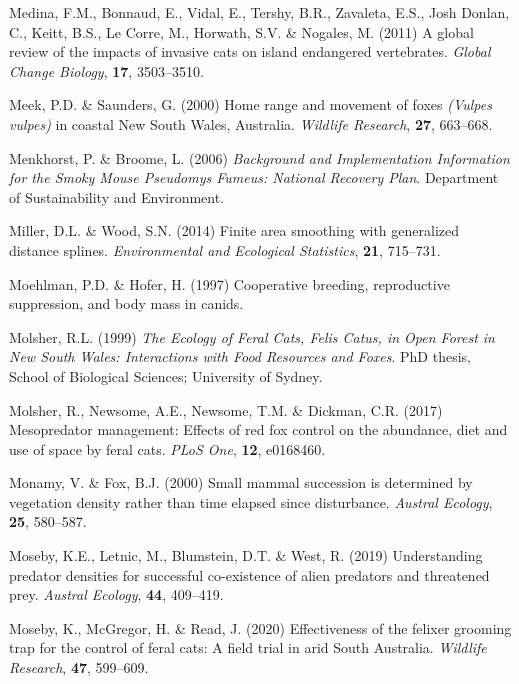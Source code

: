 \documentclass[11pt,a4paper,titlepage,twoside,openright]{style/unimelbthesis}
\begin{document}
\begin{mainmatter}
\leavevmode\hypertarget{ref-medina2011global}{}%
Medina, F.M., Bonnaud, E., Vidal, E., Tershy, B.R., Zavaleta, E.S., Josh Donlan, C., Keitt, B.S., Le Corre, M., Horwath, S.V. \& Nogales, M. (2011) A global review of the impacts of invasive cats on island endangered vertebrates. \emph{Global Change Biology}, \textbf{17}, 3503--3510.

\leavevmode\hypertarget{ref-meek2000home}{}%
Meek, P.D. \& Saunders, G. (2000) Home range and movement of foxes \emph{(Vulpes vulpes)} in coastal New South Wales, Australia. \emph{Wildlife Research}, \textbf{27}, 663--668.

\leavevmode\hypertarget{ref-menkhorst2006background}{}%
Menkhorst, P. \& Broome, L. (2006) \emph{Background and Implementation Information for the Smoky Mouse Pseudomys Fumeus: National Recovery Plan}. Department of Sustainability and Environment.

\leavevmode\hypertarget{ref-miller2014finite}{}%
Miller, D.L. \& Wood, S.N. (2014) Finite area smoothing with generalized distance splines. \emph{Environmental and Ecological Statistics}, \textbf{21}, 715--731.

\leavevmode\hypertarget{ref-moehlman1997cooperative}{}%
Moehlman, P.D. \& Hofer, H. (1997) Cooperative breeding, reproductive suppression, and body mass in canids.

\leavevmode\hypertarget{ref-molsher1999ecology}{}%
Molsher, R.L. (1999) \emph{The Ecology of Feral Cats, Felis Catus, in Open Forest in New South Wales: Interactions with Food Resources and Foxes}. PhD thesis, School of Biological Sciences; University of Sydney.

\leavevmode\hypertarget{ref-molsher2017mesopredator}{}%
Molsher, R., Newsome, A.E., Newsome, T.M. \& Dickman, C.R. (2017) Mesopredator management: Effects of red fox control on the abundance, diet and use of space by feral cats. \emph{PLoS One}, \textbf{12}, e0168460.

\leavevmode\hypertarget{ref-monamy2000small}{}%
Monamy, V. \& Fox, B.J. (2000) Small mammal succession is determined by vegetation density rather than time elapsed since disturbance. \emph{Austral Ecology}, \textbf{25}, 580--587.

\leavevmode\hypertarget{ref-moseby2019understanding}{}%
Moseby, K.E., Letnic, M., Blumstein, D.T. \& West, R. (2019) Understanding predator densities for successful co-existence of alien predators and threatened prey. \emph{Austral Ecology}, \textbf{44}, 409--419.

\leavevmode\hypertarget{ref-moseby2020effectiveness}{}%
Moseby, K., McGregor, H. \& Read, J. (2020) Effectiveness of the felixer grooming trap for the control of feral cats: A field trial in arid South Australia. \emph{Wildlife Research}, \textbf{47}, 599--609.


\end{mainmatter}
\end{document}
